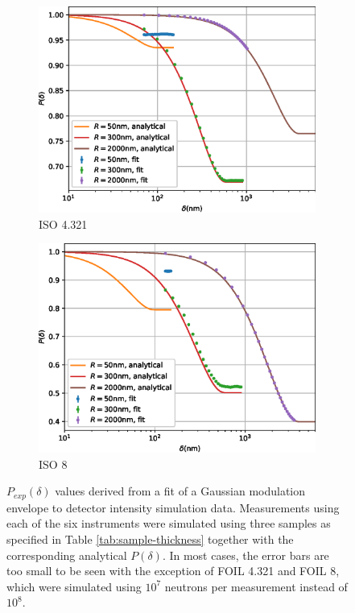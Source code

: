 \begin{figure}[p]
\begin{subfigure}[b]{0.45\textwidth}
		\includegraphics[width=\textwidth]{simulation-plot-gauss-ISO-4.321}
		\caption{ISO 4.321}
		\label{fig:simulation-plot-gauss-ISO-4.321}
	\end{subfigure}
	\hfill
	\begin{subfigure}[b]{0.45\textwidth}
		\centering
		\includegraphics[width=\textwidth]{simulation-plot-gauss-ISO-8}
		\caption{ISO 8}
		\label{fig:simulation-plot-gauss-ISO-8}
	\end{subfigure}
	\caption{$P_{exp}(\delta)$ values derived from a fit of a Gaussian modulation envelope to detector intensity simulation data. Measurements using each of the six instruments were simulated using three samples as specified in Table \ref{tab:sample-thickness} together with the corresponding analytical $P(\delta)$. In most cases, the error bars are too small to be seen with the exception of FOIL 4.321 and FOIL 8, which were simulated using $10^7$ neutrons per measurement instead of $10^8$.}
	\label{fig:simulation-plot-gauss}
\end{figure}

